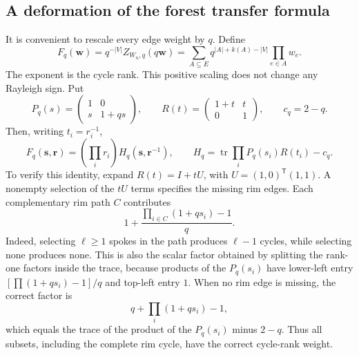 \documentclass[11pt,a4paper]{article}
\theoremstyle{definition}
\theoremstyle{remark}\newtheorem{remark}[theorem]{Remark}
\begin{document}
\subsection{A deformation of the forest transfer formula}
It is convenient to rescale every edge weight by $q$. Define
\[
 F_q(\boldsymbol w)=q^{-|V|}Z_{W_n,q}(q\boldsymbol w)
 =\sum_{A\subseteq E}q^{|A|+k(A)-|V|}\prod_{e\in A}w_e.
\]
The exponent is the cycle rank. This positive scaling does not change any Rayleigh sign. Put
\[
 P_q(s)=\begin{pmatrix}1&0\\s&1+qs\end{pmatrix},\qquad
 R(t)=\begin{pmatrix}1+t&t\\0&1\end{pmatrix},\qquad c_q=2-q.
\]
Then, writing $t_i=r_i^{-1}$,
\begin{equation}\label{wheel:transfer}
 F_q(\boldsymbol s,\boldsymbol r)=\left(\prod_i r_i\right)H_q(\boldsymbol s,\boldsymbol r^{-1}),
 \qquad H_q=\operatorname{tr}\prod_iP_q(s_i)R(t_i)-c_q.
\end{equation}
To verify this identity, expand $R(t)=I+tU$, with
$U=(1,0)^{\mathsf T}(1,1)$. A nonempty selection of the $tU$ terms specifies the missing rim edges. Each complementary rim path $C$ contributes
\[
 1+\frac{\prod_{i\in C}(1+qs_i)-1}{q}.
\]
Indeed, selecting $\ell\ge1$ spokes in the path produces $\ell-1$ cycles, while selecting none produces none. This is also the scalar factor obtained by splitting the rank-one factors inside the trace, because products of the $P_q(s_i)$ have lower-left entry $[\prod(1+qs_i)-1]/q$ and top-left entry $1$. When no rim edge is missing, the correct factor is
\[
 q+\prod_i(1+qs_i)-1,
\]
which equals the trace of the product of the $P_q(s_i)$ minus $2-q$. Thus all subsets, including the complete rim cycle, have the correct cycle-rank weight.
\end{document}
